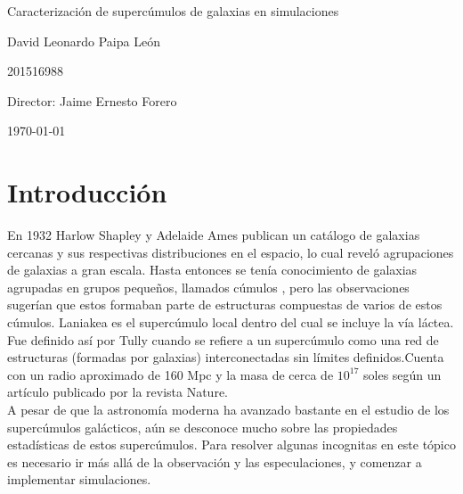 \documentclass[12pt]{article}
\begin{document}
\begin{center}
\Huge
Caracterización de supercúmulos de galaxias en simulaciones

\vspace{3mm}
\Large David Leonardo Paipa León


\large
201516988


\vspace{2mm}
\Large
Director: Jaime Ernesto Forero

\normalsize
\vspace{2mm}

\today
\end{center}


\normalsize
\section{Introducción}


En 1932 Harlow Shapley y Adelaide Ames publican un catálogo de galaxias cercanas y sus respectivas distribuciones en el espacio\cite{catalog}\cite{Shapley}, lo cual reveló agrupaciones de galaxias a gran escala. Hasta entonces se tenía conocimiento de galaxias agrupadas en grupos pequeños, llamados cúmulos , pero las observaciones sugerían que estos formaban parte de estructuras compuestas de varios de estos cúmulos. Laniakea es el supercúmulo local dentro del cual se incluye la vía láctea. Fue definido así por Tully \cite{tully} cuando se refiere a un supercúmulo como una red de estructuras (formadas por galaxias) interconectadas sin límites definidos.Cuenta con un radio aproximado de 160 Mpc y la masa de cerca de $10^17$ soles según un artículo publicado por la revista Nature\cite{nature}.\\

A pesar de que la astronomía moderna ha avanzado bastante en el estudio de los supercúmulos galácticos, aún se desconoce mucho sobre las propiedades estadísticas de estos supercúmulos. Para resolver algunas incognitas en este tópico es necesario ir más allá de la observación y las especulaciones, y comenzar a implementar simulaciones.\\
\end{document}
